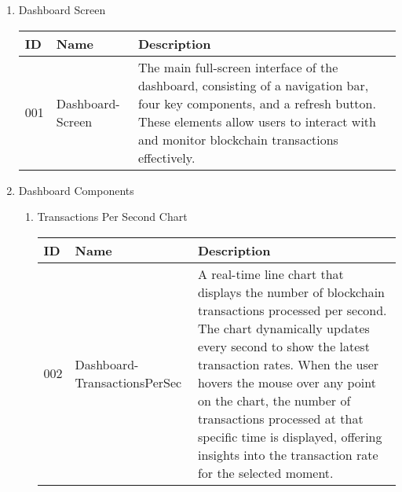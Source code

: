 \documentclass[conference]{IEEEtran}
\begin{document}
\begin{enumerate}[itemsep=2ex, parsep=1ex]
	\item Dashboard Screen
	      \begin{table}[h!]
	      	\def\arraystretch{1.24} \small
	      	\begin{tabular}{|p{1.2cm}|p{2.5cm}|p{4.0cm}|}
	      		\hline
	      		ID  & Name             & Description                                                                                                                                                                                                              \\
	      		\hline
	      		001 & Dashboard-Screen & The main full-screen interface of the dashboard, consisting of a navigation bar, four key components, and a refresh button. These elements allow users to interact with and monitor blockchain transactions effectively. \\
	      		\hline
	      	\end{tabular}
	      \end{table}
	      
	      \vspace{10cm}
	      
	\item Dashboard Components
	      \begin{enumerate}[itemsep=2ex, parsep=1ex]
	      	\item Transactions Per Second Chart
	      	      \begin{table}[h!]
	      	      	\def\arraystretch{1.24} \small
	      	      	\begin{tabular}{|p{1.2cm}|p{2.5cm}|p{4.0cm}|}
	      	      		\hline
	      	      		ID  & Name                         & Description                                                                                                                                                                                                                                                                                                                                                                                 \\
	      	      		\hline
	      	      		002 & Dashboard-TransactionsPerSec & A real-time line chart that displays the number of blockchain transactions processed per second. The chart dynamically updates every second to show the latest transaction rates. When the user hovers the mouse over any point on the chart, the number of transactions processed at that specific time is displayed, offering insights into the transaction rate for the selected moment. \\
	      	      		\hline
	      	      	\end{tabular}
	      	      \end{table}
	      	      

\end{enumerate}
\end{enumerate}
\end{document}
